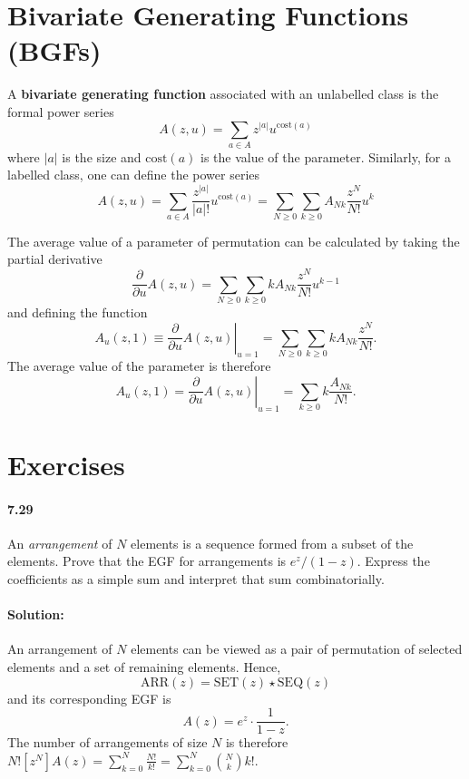 \documentclass{article}
\begin{document}
\section{Bivariate Generating Functions (BGFs)}

A \textbf{bivariate generating function} associated with an unlabelled class
is the formal power series \begin{equation*}
  A(z, u) = \sum_{a \in A} z^{|a|}u^{\mathrm{cost}(a)}
\end{equation*} where $|a|$ is the size and $\mathrm{cost}(a)$ is the value of
the parameter. Similarly, for a labelled class, one can define the power series
\begin{equation*}
  A(z, u) = \sum_{a \in A} \frac{z^{|a|}}{|a|!}u^{\mathrm{cost}(a)} =
  \sum_{N \geq 0} \sum_{k \geq 0} A_{Nk}\frac{z^N}{N!}u^k \end{equation*}

The average value of a parameter of permutation can be calculated by taking
the partial derivative \begin{equation*}
  \frac{\partial}{\partial u} A(z, u) = \sum_{N \geq 0} \sum_{k \geq 0} kA_{Nk}
  \frac{z^N}{N!}u^{k - 1}
\end{equation*} and defining the function \begin{equation*}
  A_u(z, 1) \equiv \left.\frac{\partial}{\partial u}A(z, u)\right|_{u = 1} =
  \sum_{N \geq 0} \sum_{k \geq 0} kA_{Nk}\frac{z^N}{N!}.
\end{equation*} The average value of the parameter is therefore
\begin{equation*}
  [z^N]A_u(z, 1) = \left.\frac{\partial}{\partial u}A(z, u)\right|_{u = 1} =
  \sum_{k \geq 0} k\frac{A_{Nk}}{N!}.
\end{equation*}

\section*{Exercises}

\paragraph{7.29} An \emph{arrangement} of $N$ elements is a sequence formed
from a subset of the elements. Prove that the EGF for arrangements is $e^z/(1 -
z)$. Express the coefficients as a simple sum and interpret that sum
combinatorially.

\paragraph{Solution:} An arrangement of $N$ elements can be viewed as a pair of
permutation of selected elements and a set of remaining elements. Hence,
\begin{equation*}
  \mathrm{ARR}(z) = \mathrm{SET}(z) \star \mathrm{SEQ}(z)
\end{equation*} and its corresponding EGF is \begin{equation*}
  A(z) = e^z \cdot \frac{1}{1 - z}.
\end{equation*} The number of arrangements of size $N$ is therefore
$N![z^N]A(z) = \sum_{k = 0}^N \frac{N!}{k!} = \sum_{k = 0}^N \binom{N}{k}k!$.
\end{document}

